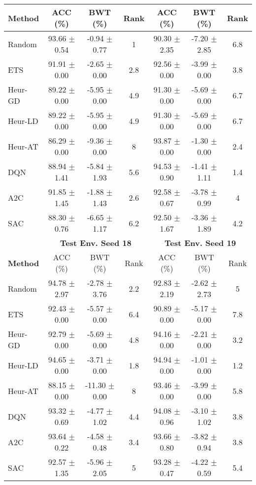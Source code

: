 \begin{tabular}{lcccccc}
	\cmidrule(lr){2-4} \cmidrule(lr){5-7}
	\textbf{Method} & ACC (\%)          & BWT (\%)          & Rank   & ACC (\%)          & BWT (\%)          & Rank   \\
	\midrule 
	Random          & 93.66 $\pm$ 0.54    & -0.94 $\pm$ 0.77    & 1      & 90.30 $\pm$ 2.35    & -7.20 $\pm$ 2.85    & 6.8    \\
	ETS             & 91.91 $\pm$ 0.00    & -2.65 $\pm$ 0.00    & 2.8    & 92.56 $\pm$ 0.00    & -3.99 $\pm$ 0.00    & 3.8    \\
	Heur-GD         & 89.22 $\pm$ 0.00    & -5.95 $\pm$ 0.00    & 4.9    & 91.30 $\pm$ 0.00    & -5.69 $\pm$ 0.00    & 6.7    \\
	Heur-LD         & 89.22 $\pm$ 0.00    & -5.95 $\pm$ 0.00    & 4.9    & 91.30 $\pm$ 0.00    & -5.69 $\pm$ 0.00    & 6.7    \\
	Heur-AT         & 86.29 $\pm$ 0.00    & -9.36 $\pm$ 0.00    & 8      & 93.87 $\pm$ 0.00    & -1.30 $\pm$ 0.00    & 2.4    \\
	DQN             & 88.94 $\pm$ 1.41    & -5.84 $\pm$ 1.93    & 5.6    & 94.53 $\pm$ 0.90    & -1.41 $\pm$ 1.11    & 1.4    \\
	A2C             & 91.85 $\pm$ 1.45    & -1.88 $\pm$ 1.43    & 2.6    & 92.58 $\pm$ 0.67    & -3.78 $\pm$ 0.99    & 4      \\
	SAC             & 88.30 $\pm$ 0.76    & -6.65 $\pm$ 1.17    & 6.2    & 92.50 $\pm$ 1.67    & -3.36 $\pm$ 1.89    & 4.2    \\
	\midrule 
	& \multicolumn{3}{c}{\textbf{Test Env. Seed 18}} & \multicolumn{3}{c}{\textbf{Test Env. Seed 19}} \\
	\cmidrule(lr){2-4} \cmidrule(lr){5-7}
	\textbf{Method} & ACC (\%)          & BWT (\%)          & Rank   & ACC (\%)          & BWT (\%)          & Rank   \\
	\midrule 
	Random          & 94.78 $\pm$ 2.97    & -2.78 $\pm$ 3.76    & 2.2    & 92.83 $\pm$ 2.19    & -2.62 $\pm$ 2.73    & 5      \\
	ETS             & 92.43 $\pm$ 0.00    & -5.57 $\pm$ 0.00    & 6.4    & 90.89 $\pm$ 0.00    & -5.17 $\pm$ 0.00    & 7.8    \\
	Heur-GD         & 92.79 $\pm$ 0.00    & -5.69 $\pm$ 0.00    & 4.8    & 94.16 $\pm$ 0.00    & -2.21 $\pm$ 0.00    & 3.2    \\
	Heur-LD         & 94.65 $\pm$ 0.00    & -3.71 $\pm$ 0.00    & 1.8    & 94.94 $\pm$ 0.00    & -1.01 $\pm$ 0.00    & 1.2    \\
	Heur-AT         & 88.15 $\pm$ 0.00    & -11.30 $\pm$ 0.00   & 8      & 93.46 $\pm$ 0.00    & -3.99 $\pm$ 0.00    & 5.8    \\
	DQN             & 93.32 $\pm$ 0.69    & -4.77 $\pm$ 1.02    & 4.4    & 94.08 $\pm$ 0.96    & -3.10 $\pm$ 1.02    & 3.8    \\
	A2C             & 93.64 $\pm$ 0.22    & -4.58 $\pm$ 0.48    & 3.4    & 93.66 $\pm$ 0.80    & -3.82 $\pm$ 0.94    & 3.8    \\
	SAC             & 92.57 $\pm$ 1.35    & -5.96 $\pm$ 2.05    & 5      & 93.28 $\pm$ 0.47    & -4.22 $\pm$ 0.59    & 5.4   \\
	\bottomrule 
\end{tabular}